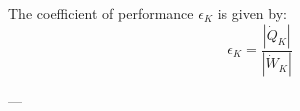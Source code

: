 The coefficient of performance \( \epsilon_K \) is given by:  
\[
\epsilon_K = \frac{|\dot{Q}_K|}{|\dot{W}_K|}
\]

---